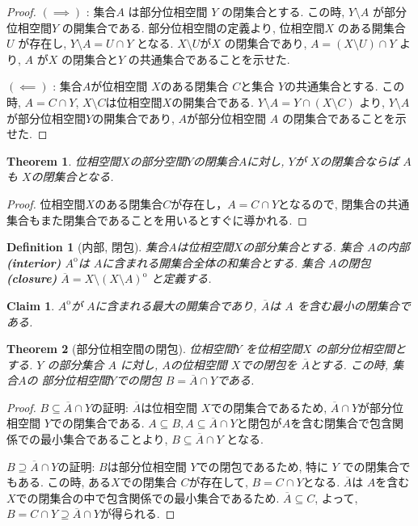 \documentclass[dvipdfmx]{jbook}
\newcommand{\cl}[1]{\overline{ #1}  }
\newcommand{\Int}[1]{#1 ^{\mathrm{o}} }
\newtheorem{theorem}{Theorem}[section]
\newtheorem{definition}{Definition}[section]
\newtheorem{claim}{Claim}[section]
\theoremstyle{remark}
\theoremstyle{plain}
\begin{document}
\begin{proof}
	$\left( \implies \right) $ : 集合$A$ は部分位相空間 $Y$ の閉集合とする. 
	この時, $Y\setminus A$ が部分位相空間$Y$ の開集合である.
	部分位相空間の定義より, 位相空間$X$ のある開集合 $U$ が存在し, $Y\setminus A = U \cap Y$ となる. 
	$X\setminus U$が$X$ の閉集合であり, $A = \left( X \setminus U \right) \cap Y$ より, $A$ が$X$ の閉集合と$Y$ の共通集合であることを示せた.
	
	$\left( \impliedby \right) $ : 集合$A$が位相空間 $X$のある閉集合 $C$と集合 $Y$の共通集合とする.
	この時, $A=C\cap Y$,  $X\setminus C$は位相空間$X$の開集合である.
	$Y\setminus A = Y\cap \left( X \setminus C \right) $  より, $Y\setminus A$が部分位相空間$Y$の開集合であり,  $A$が部分位相空間 $A$ の閉集合であることを示せた.
\end{proof}

\begin{theorem}
\label{the:closedset}
	位相空間$X$の部分空間$Y$の閉集合$A$に対し,  $Y$が $X$の閉集合ならば $A$も $X$の閉集合となる.
\end{theorem}

\begin{proof}
	位相空間$X$のある閉集合$C$が存在し，$A = C\cap Y$となるので, 閉集合の共通集合もまた閉集合であることを用いるとすぐに導かれる.
\end{proof}

\begin{definition}[内部, 閉包]
	集合$A$は位相空間$X$の部分集合とする. 
	集合 $A$の内部\textbf{(interior)} $\Int{A}$は $A$に含まれる開集合全体の和集合とする. 
	集合 $A$の閉包\textbf{(closure)} $\cl{A}= X \setminus\Int{ \left( X\setminus A \right)}$ と定義する.
\end{definition}

\begin{claim}
	$\Int{A}$が $A$に含まれる最大の開集合であり,  $\cl{A}$は $A$ を含む最小の閉集合である.
\end{claim}

\begin{theorem}[部分位相空間の閉包]
	位相空間$Y$ を位相空間$X$ の部分位相空間とする. 
	$Y$ の部分集合 $A$ に対し, $A$の位相空間 $X$での閉包を $\cl{A}$とする.
	この時, 集合$A$の 部分位相空間$Y$での閉包 $B= \cl{A} \cap Y$である.
\end{theorem}

\begin{proof}
	$B \subseteq \cl{A} \cap Y $の証明:  $\cl{A}$は位相空間 $X$での閉集合であるため,  $\cl{A} \cap Y $が部分位相空間 $Y$での閉集合である.  
	$A \subseteq B, A \subseteq \cl{A} \cap Y$と閉包が$A$を含む閉集合で包含関係での最小集合であることより, $B \subseteq \cl{A} \cap Y$ となる.

	$B \supseteq \cl{A} \cap Y$の証明:  $B$は部分位相空間 $Y$での閉包であるため, 特に $Y$ での閉集合でもある. 
	この時, ある$X$での閉集合 $C$が存在して,  $B=C \cap Y$となる.  
	$\cl{A}$は $A$を含む $X$での閉集合の中で包含関係での最小集合であるため. 
	$\cl{A} \subseteq C$, よって,  $B = C \cap Y \supseteq \cl{A} \cap Y$が得られる.
\end{proof}
\end{document}
